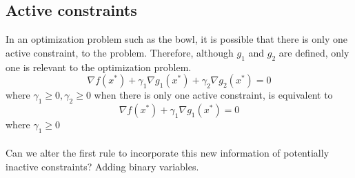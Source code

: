 \subsection{Active constraints}
In an optimization problem such as the bowl, it is possible that there is only one active constraint, to the problem. Therefore, although $g_1$ and $g_2$ are defined, only one is relevant to the optimization problem.
\begin{equation}
  \nabla f(x^*) + \gamma_1 \nabla g_1(x^*) + \gamma_2 \nabla g_2(x^*)  = 0
\end{equation}
where $\gamma_1 \geq 0, \gamma_2 \geq 0$ when there is only one active constraint, is equivalent to
\begin{equation}
  \nabla f(x^*) + \gamma_1 \nabla g_1(x^*)  = 0
\end{equation}
where $\gamma_1 \geq 0 $
\\ \\
Can we alter the first rule to incorporate this new information of potentially inactive constraints? Adding binary variables.